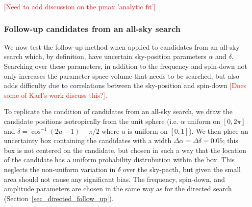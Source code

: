 \documentclass[aps, prd, twocolumn, superscriptaddress, floatfix, showpacs, nofootinbib, longbibliography]{revtex4-1}
\newcommand{\comment}[1]{\textcolor{red}{[#1]}}
\begin{document}
\comment{Need to add discussion on the pmax 'analytic fit'}

\subsubsection{Follow-up candidates from an all-sky search}
\label{sec_all_sky_follow_up}

We now test the follow-up method when applied to candidates from an all-sky
search which, by definition, have uncertain sky-position parameters $\alpha$
and $\delta$. Searching over these parameters, in addition to the frequency
and spin-down not only increases the parameter space volume that needs to be
searched, but also adds difficulty due to correlations between the sky-position
and spin-down \comment{Does some of Karl's work discuss this?}.

To replicate the condition of candidates from an all-sky search, we draw the
candidate positions isotropically from the unit sphere (i.e. $\alpha$ uniform
on $[0, 2\pi]$ and $\delta = \cos^{-1}(2u{-}1){- }\pi/2$ where $u$ is uniform
on $[0, 1]$). We then place an uncertainty box containing the candidates with a
width $\Delta\alpha=\Delta\delta=0.05$; this box is not centered on the
candidate, but chosen in such a way that the location of the candidate has a
uniform probability distrubution within the box. This neglects the non-uniform
variation in $\delta$ over the sky-pacth, but given the small area should not
cause any significant bias. The frequency, spin-down, and amplitude parameters
are chosen in the same way as for the directed search
(Section~\ref{sec_directed_follow_up}).
\end{document}
